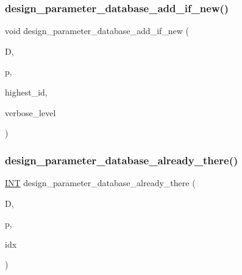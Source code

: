 \subsubsection{\texorpdfstring{design\+\_\+parameter\+\_\+database\+\_\+add\+\_\+if\+\_\+new()}{design\_parameter\_database\_add\_if\_new()}}
{\footnotesize\ttfamily void design\+\_\+parameter\+\_\+database\+\_\+add\+\_\+if\+\_\+new (\begin{DoxyParamCaption}\item[{\mbox{\hyperlink{classdatabase}{database}} \&}]{D,  }\item[{\mbox{\hyperlink{classdesign__parameter}{design\+\_\+parameter}} \&}]{p,  }\item[{\mbox{\hyperlink{galois_8h_a09fddde158a3a20bd2dcadb609de11dc}{I\+NT}} \&}]{highest\+\_\+id,  }\item[{\mbox{\hyperlink{galois_8h_a09fddde158a3a20bd2dcadb609de11dc}{I\+NT}}}]{verbose\+\_\+level }\end{DoxyParamCaption})}

\mbox{\label{_l_i_b_2_d_i_s_c_r_e_t_a_2design_8_c_a1a30451e84e5db071c2b0de9262b9753}} 
\subsubsection{\texorpdfstring{design\+\_\+parameter\+\_\+database\+\_\+already\+\_\+there()}{design\_parameter\_database\_already\_there()}}
{\footnotesize\ttfamily \mbox{\hyperlink{galois_8h_a09fddde158a3a20bd2dcadb609de11dc}{I\+NT}} design\+\_\+parameter\+\_\+database\+\_\+already\+\_\+there (\begin{DoxyParamCaption}\item[{\mbox{\hyperlink{classdatabase}{database}} \&}]{D,  }\item[{\mbox{\hyperlink{classdesign__parameter}{design\+\_\+parameter}} \&}]{p,  }\item[{\mbox{\hyperlink{galois_8h_a09fddde158a3a20bd2dcadb609de11dc}{I\+NT}} \&}]{idx }\end{DoxyParamCaption})}

